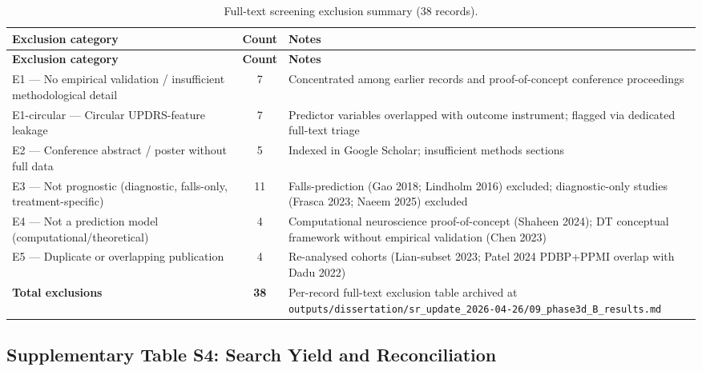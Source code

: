 \small
\begin{longtable}{@{}p{4.2cm}cp{8.5cm}@{}}
\caption{Full-text screening exclusion summary (38 records).} \\
\toprule
\textbf{Exclusion category} & \textbf{Count} & \textbf{Notes} \\
\midrule
\endfirsthead
\toprule
\textbf{Exclusion category} & \textbf{Count} & \textbf{Notes} \\
\midrule
\endhead
\bottomrule
\endlastfoot
E1 --- No empirical validation / insufficient methodological detail & 7 & Concentrated among earlier records and proof-of-concept conference proceedings \\
E1-circular --- Circular UPDRS-feature leakage & 7 & Predictor variables overlapped with outcome instrument; flagged via dedicated full-text triage \\
E2 --- Conference abstract / poster without full data & 5 & Indexed in Google Scholar; insufficient methods sections \\
E3 --- Not prognostic (diagnostic, falls-only, treatment-specific) & 11 & Falls-prediction (Gao 2018; Lindholm 2016) excluded; diagnostic-only studies (Frasca 2023; Naeem 2025) excluded \\
E4 --- Not a prediction model (computational/theoretical) & 4 & Computational neuroscience proof-of-concept (Shaheen 2024); DT conceptual framework without empirical validation (Chen 2023) \\
E5 --- Duplicate or overlapping publication & 4 & Re-analysed cohorts (Lian-subset 2023; Patel 2024 PDBP+PPMI overlap with Dadu 2022) \\
\midrule
\textbf{Total exclusions} & \textbf{38} & Per-record full-text exclusion table archived at \texttt{outputs/dissertation/sr\_update\_2026-04-26/09\_phase3d\_B\_results.md} \\
\end{longtable}
\normalsize

\subsection*{Supplementary Table S4: Search Yield and Reconciliation}
\label{sr:tab:supp:reconciliation}

